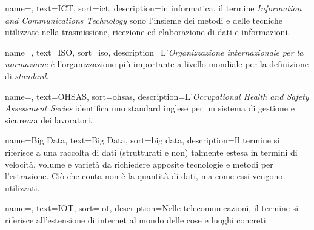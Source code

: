 {
    name=,
    text=ICT,
    sort=ict,
    description={in informatica, il termine \emph{Information and Communications Technology} sono l'insieme dei metodi e delle tecniche utilizzate nella trasmissione, ricezione ed elaborazione di dati e informazioni.}
}

{
    name=,
    text=ISO,
    sort=iso,
    description={L'\emph{Organizzazione internazionale per la normazione} è l'organizzazione più importante a livello mondiale per la definizione di \textit{standard}.}
}

{
    name=,
    text=OHSAS,
    sort=ohsas,
    description={L'\emph{Occupational Health and Safety Assessment Series} identifica uno standard inglese per un sistema di gestione e sicurezza dei lavoratori.}
}

{
    name=Big Data,
    text=Big Data,
    sort=big data,
    description={Il termine si riferisce a una raccolta di dati (strutturati e non) talmente estesa in termini di velocità, volume e varietà da richiedere apposite tecnologie e metodi per l'estrazione. Ciò che conta non è la quantità di dati, ma come essi vengono utilizzati.}
}

{
    name=,
    text=IOT,
    sort=iot,
    description={Nelle telecomunicazioni, il termine si riferisce all'estensione di internet al mondo delle cose e luoghi concreti.}
}
